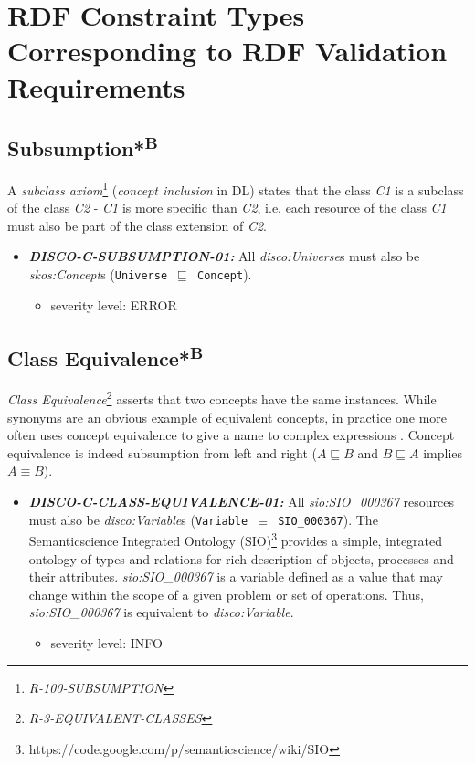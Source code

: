 \documentclass{llncs}
\newcommand{\ms}[1]{\texttt{#1}}
\begin{document}

\section{RDF Constraint Types Corresponding to RDF Validation Requirements}
\label{RDF-validation-requirements-constraint-types}

\subsection{Subsumption*\textsuperscript{B}}

A \emph{subclass axiom}\footnote{{\em R-100-SUBSUMPTION}} ({\em concept inclusion} in DL) states that the class \emph{C1} is a subclass of the class \emph{C2} - \emph{C1} is more specific than \emph{C2}, 
i.e. each resource of the class \emph{C1} must also be part of the class extension of \emph{C2}.

\begin{itemize}
	\item \textbf{{\em DISCO-C-SUBSUMPTION-01:}} 
All {\em disco:Universe}s must also be {\em skos:Concept}s (\ms{Universe $\sqsubseteq$ Concept}).
	\begin{itemize}
		\item severity level: ERROR
	\end{itemize}
\end{itemize}

\subsection{Class Equivalence*\textsuperscript{B}}

{\em Class Equivalence}\footnote{{\em R-3-EQUIVALENT-CLASSES}} asserts that two concepts have the same instances.
While synonyms are an obvious example of equivalent concepts, in practice one more
often uses concept equivalence to give a name to complex expressions \cite{Kroetzsch2012}.
Concept equivalence is indeed subsumption from left and right ($A \sqsubseteq B$ and $B \sqsubseteq A$ implies $A \equiv B$).

\begin{itemize}
	\item \textbf{{\em DISCO-C-CLASS-EQUIVALENCE-01:}}
All {\em sio:SIO\_000367} resources must also be {\em disco:Variable}s (\ms{Variable $\equiv$ SIO\_000367}).
The Semanticscience Integrated Ontology (SIO)\footnote{https://code.google.com/p/semanticscience/wiki/SIO} provides a simple, integrated ontology of types and relations for rich description of objects, processes and their attributes.
{\em sio:SIO\_000367} is a variable defined as a value that may change within the scope of a given problem or set of operations.
Thus, {\em sio:SIO\_000367} is equivalent to {\em disco:Variable}.
\begin{itemize}
	\item severity level: INFO
\end{itemize}
\end{itemize}
\end{document}
